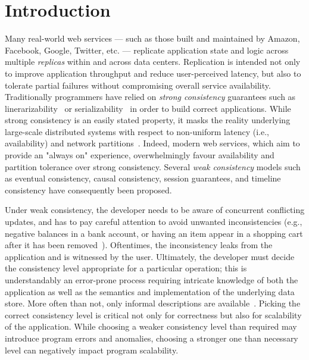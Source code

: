 \section{Introduction}

Many real-world web services --- such as those built and maintained by
Amazon, Facebook, Google, Twitter, etc. --- replicate application state and
logic across multiple \emph{replicas} within and across data
centers. Replication is intended not only to improve application throughput
and reduce user-perceived latency, but also to tolerate partial failures
without compromising overall service availability. Traditionally programmers
have relied on \emph{strong consistency} guarantees such as
linerarizability~\cite{Herlihy1990} or
serializability~\cite{Serializability} in order to build correct
applications. While strong consistency is an easily stated property, it
masks the reality underlying large-scale distributed systems with respect to
non-uniform latency (i.e., availability) and network
partitions~\cite{Brewer2000,Gilbert}.  Indeed, modern web services, which
aim to provide an "always on" experience, overwhelmingly favour availability
and partition tolerance over strong consistency. Several \emph{weak
  consistency} models such as eventual consistency, causal consistency,
session guarantees, and timeline consistency have consequently been
proposed.

Under weak consistency, the developer needs to be aware of concurrent
conflicting updates, and has to pay careful attention to avoid unwanted
inconsistencies (e.g., negative balances in a bank account, or having an
item appear in a shopping cart after it has been
removed~\cite{Dynamo}). Oftentimes, the inconsistency leaks from the
application and is witnessed by the user.  Ultimately, the developer must
decide the consistency level appropriate for a particular operation; this is
understandably an error-prone process requiring intricate knowledge of both
the application as well as the semantics and implementation of the
underlying data store.  More often than not, only informal descriptions are
available~\cite{}.  Picking the correct consistency level is critical not
only for correctness but also for scalability of the application. While
choosing a weaker consistency level than required may introduce program
errors and anomalies, choosing a stronger one than necessary level can
negatively impact program scalability.





